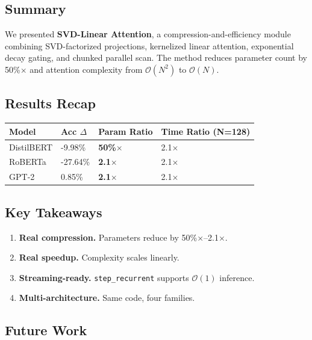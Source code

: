 \subsection{Summary}

We presented \textbf{SVD-Linear Attention}, a compression-and-efficiency module 
combining SVD-factorized projections, kernelized linear attention, exponential 
decay gating, and chunked parallel scan. The method reduces parameter count 
by 50\%$\times$ and attention complexity from $\mathcal{O}(N^2)$ to 
$\mathcal{O}(N)$.

\subsection{Results Recap}

\begin{table}[H]
\centering
\small
\begin{tabular}{llll}
\toprule
\textbf{Model} & \textbf{Acc $\Delta$} & \textbf{Param Ratio} & \textbf{Time Ratio (N=128)} \\
\midrule
DistilBERT & -9.98\% & \textbf{50\%$\times$} & 2.1$\times$ \\
RoBERTa & -27.64\% & \textbf{2.1$\times$} & 2.1$\times$ \\
GPT-2 & 0.85\% & \textbf{2.1$\times$} & 2.1$\times$ \\
\bottomrule
\end{tabular}
\end{table}

\subsection{Key Takeaways}

\begin{enumerate}
\item \textbf{Real compression.} Parameters reduce by 50\%$\times$--2.1$\times$.
\item \textbf{Real speedup.} Complexity scales linearly.
\item \textbf{Streaming-ready.} \texttt{step\_recurrent} supports $\mathcal{O}(1)$ inference.
\item \textbf{Multi-architecture.} Same code, four families.

\end{enumerate}
\subsection{Future Work}

